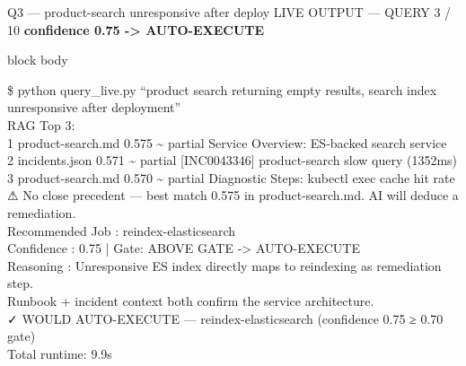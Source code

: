 \documentclass[aspectratio=169,10pt]{beamer}
\newcommand{\slidecat}[1]{{\color{cdim}\ttfamily\scriptsize\MakeUppercase{#1}}}
\newenvironment{terminal}{%
  \begin{beamercolorbox}[sep=6pt,rounded=true,shadow=false]{block body}%
  \ttfamily\tiny\color{cterm}%
}{%
  \end{beamercolorbox}%
}
\begin{document}
\begin{frame}{Q3 — product-search unresponsive after deploy}
  \slidecat{Live Output — Query 3 / 10}
  {\color{cteal}\ttfamily\small\bfseries confidence 0.75 -> AUTO-EXECUTE}
  \vspace{0.15cm}
  \begin{terminal}
    \$ python query\_live.py ``product search returning empty results, search index unresponsive after deployment''\\
    \vspace{0.25em}
    RAG Top 3:\\
    \hspace*{0.4cm}1  product-search.md  0.575 \textasciitilde{} partial  Service Overview: ES-backed search service\\
    \hspace*{0.4cm}2  incidents.json     0.571 \textasciitilde{} partial  [INC0043346] product-search slow query (1352ms)\\
    \hspace*{0.4cm}3  product-search.md  0.570 \textasciitilde{} partial  Diagnostic Steps: kubectl exec cache hit rate\\
    \vspace{0.25em}
    ⚠ No close precedent — best match 0.575 in product-search.md. AI will deduce a remediation.\\
    \vspace{0.25em}
    Recommended Job : {\color{cauto}reindex-elasticsearch}\\
    Confidence      : {\color{cauto}0.75}  |  Gate: {\color{cauto}ABOVE GATE -> AUTO-EXECUTE}\\
    Reasoning       : Unresponsive ES index directly maps to reindexing as remediation step.\\
    \hspace*{0.4cm}Runbook + incident context both confirm the service architecture.\\
    \vspace{0.25em}
    {\color{cauto}✓ WOULD AUTO-EXECUTE  —  reindex-elasticsearch  (confidence 0.75 ≥ 0.70 gate)}\\
    Total runtime: 9.9s
  \end{terminal}
\end{frame}
\end{document}
